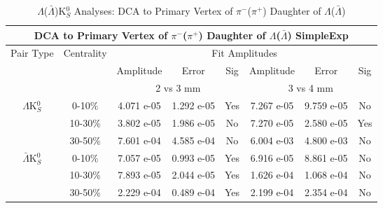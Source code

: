 \documentclass[../AnalysisNoteJBuxton.tex]{subfiles}
\begin{document}
\begin{table}
 \centering
 \begin{tabular}{|c|c|c|c|c||c|c|c|}
  \multicolumn{8}{c}{DCA to Primary Vertex of $\pi^{-}$($\pi^{+}$) Daughter of $\Lambda$($\bar{\Lambda}$) SimpleExp} \\
  \hline
  \multirow{3}{*}{Pair Type} & \multirow{3}{*}{Centrality} & \multicolumn{6}{c|}{Fit Amplitudes} \\
  \cline{3-8}
   & & Amplitude & Error & Sig & Amplitude & Error & Sig \\  
  \cline{3-8}
   & & \multicolumn{3}{c||}{2 vs 3 mm} & \multicolumn{3}{c|}{3 vs 4 mm} \\  
  \hline  
  \multirow{3}{*}{$\Lambda$K$^{0}_{S}$}  
   &  0-10\% & 4.071 e-05 & 1.292 e-05 & Yes & 7.267 e-05 & 9.759 e-05 & No \\
   & 10-30\% & 3.802 e-05 & 1.986 e-05 & No & 7.270 e-05 & 2.580 e-05 & Yes \\
   & 30-50\% & 7.601 e-04 & 4.585 e-04 & No & 6.004 e-03 & 4.800 e-03 & No \\
  \hline  
  \multirow{3}{*}{$\bar{\Lambda}$K$^{0}_{S}$}  
   &  0-10\% & 7.057 e-05 & 0.993 e-05 & Yes & 6.916 e-05 & 8.861 e-05 & No \\
   & 10-30\% & 7.893 e-05 & 2.044 e-05 & Yes & 1.626 e-04 & 1.068 e-04 & No \\
   & 30-50\% & 2.229 e-04 & 0.489 e-04 & Yes & 2.199 e-04 & 2.354 e-04 & No \\
  \hline
 \end{tabular}
 \caption{$\Lambda$($\bar{\Lambda}$)K$^{0}_{S}$ Analyses: DCA to Primary Vertex of $\pi^{-}$($\pi^{+}$) Daughter of $\Lambda$($\bar{\Lambda}$)}
 \label{tab:DcaToPrimVertexPionDaughtOfLamLamK0_SimpleExp}
\end{table}
\end{document}
